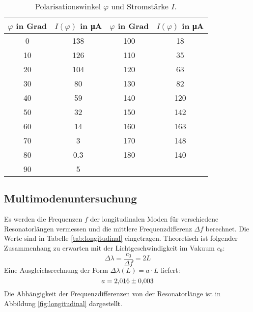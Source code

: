 \begin{table}
 \centering
 \caption{Polarisationswinkel $\varphi$ und Stromstärke $I$.}
 \label{tab:polarisation}
 \begin{tabular}{c c c c}
   \toprule
   $\varphi$ in Grad & $I(\varphi)$ in \si{\micro\ampere} & $\varphi$ in Grad & $I(\varphi)$ in \si{\micro\ampere} \\
   \midrule
   0  & 138 & 100 & 18  \\
   10 & 126 & 110 & 35  \\
   20 & 104 & 120 & 63  \\
   30 & 80  & 130 & 82  \\
   40 & 59  & 140 & 120 \\
   50 & 32  & 150 & 142 \\
   60 & 14  & 160 & 163 \\
   70 & 3   & 170 & 148 \\
   80 & 0.3 & 180 & 140 \\
   90 & 5   & & \\
   \bottomrule
 \end{tabular}
\end{table}

\subsection{Multimodenuntersuchung}
\label{sec:mul}

Es werden die Frequenzen $f$ der longitudinalen Moden für verschiedene Resonatorlängen vermessen und die mittlere Frequenzdifferenz $\Delta f$ berechnet.
Die Werte sind in Tabelle \ref{tab:longitudinal} eingetragen.
Theoretisch ist folgender Zusammenhang zu erwarten mit der Lichtgeschwindigkeit im Vakuum $c_0$:
\begin{equation}
  \Delta\lambda = \frac{c_0}{\Delta f} = 2L
\end{equation}
Eine Ausgleichsrechnung der Form $\Delta\lambda(L) = a \cdot L$ liefert:
\begin{equation*}
  a = \num{2.016 \pm 0.003}
\end{equation*}
Die Abhängigkeit der Frequenzdifferenzen von der Resonatorlänge ist in Abbildung \ref{fig:longitudinal} dargestellt.

